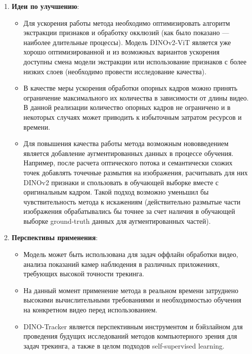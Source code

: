 \documentclass[a4paper, 14pt]{extarticle}
\theoremstyle{definition}
\theoremstyle{plain}
\theoremstyle{remark}
\begin{document}
\begin{enumerate}
    \item \textbf{Идеи по улучшению}:
    \begin{itemize}
        \item Для ускорения работы метода необходимо оптимизировать алгоритм экстракции признаков и обработку окклюзий (как было показано --- наиболее длительные процессы). Модель DINOv2-ViT является уже хорошо оптимизированной и из возможных вариантов ускорения доступны смена модели экстракции или использование признаков с более низких слоев (необходимо провести исследование качества). 
        \item В качестве меры ускорения обработки опорных кадров можно принять ограничение максимального их количества в зависимости от длины видео. В данной реализации количество опорных кадров не ограничено и в некоторых случаях может приводить к избыточным затратом ресурсов и времени.
        \item Для повышения качества работы метода возможным нововведением является добавление аугментированных данных в процессе обучения. Например, после расчета оптического потока и семантически схожих точек добавлять точечные размытия на изображения, расчитывать для них DINOv2 признаки и спользовать в обучающей выборке вместе с оригинальным кадром. Такой подход возможно уменьшил бы чувствительность метода к искажениям (действительно размытые части изображения обрабатывались бы точнее за счет наличия в обучающей выборке ground-truth данных для аугментированных частей).
    \end{itemize}

    \item \textbf{Перспективы применения}:
    \begin{itemize}
        \item Модель может быть использована для задач оффлайн обработки видео, анализа показаний камер наблюдения в различных приложениях, требующих высокой точности трекинга.
        \item На данный момент применение метода в реальном времени затруднено высокими вычислительными требованиями и необходимостью обучения на конкретном видео перед использованием. 
        \item DINO-Tracker является перспективным инструментом и бэйзлайном для проведения будущих исследований методов компьютерного зрения для задач трекинга, а также в целом подходов self-supervised learning.
    \end{itemize}
\end{enumerate}

\newpage
\end{document}
